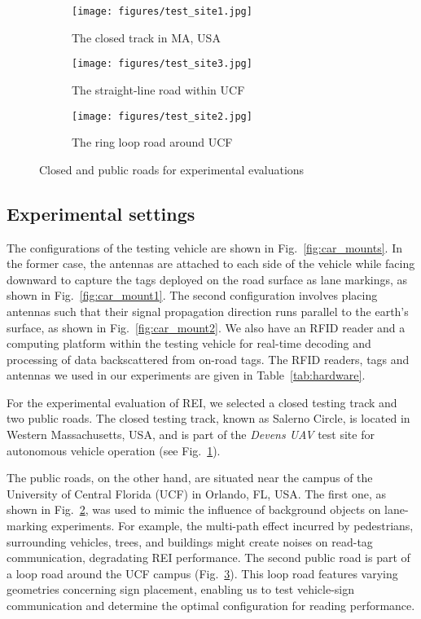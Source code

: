 \documentclass[lettersize,journal]{IEEEtran}
\begin{document}
\begin{figure*}[tb!]
\centering
\begin{subfigure}{0.3\textwidth}
  \centering
  
  \texttt{[image: figures/test\_site1.jpg]}
  \caption{The closed track in MA, USA}
  \label{fig:testing_road1}
\end{subfigure}
\begin{subfigure}{0.3\textwidth}
  \centering
  \texttt{[image: figures/test\_site3.jpg]}
  \caption{The straight-line road within UCF}
  \label{fig:testing_road2}
\end{subfigure}
\begin{subfigure}{0.3\textwidth}
  \centering
  \texttt{[image: figures/test\_site2.jpg]}
  \caption{The ring loop road around UCF}
  \label{fig:testing_road3}
\end{subfigure}
\caption{Closed and public roads for experimental evaluations}
\label{fig:testing_roads}
\end{figure*}

  
\subsection{Experimental settings}
The configurations of the testing vehicle are shown in Fig.~\ref{fig:car_mounts}. In the former case, the antennas are attached to each side of the vehicle while facing downward to capture the tags deployed on the road surface as lane markings, as shown in Fig.~\ref{fig:car_mount1}. The second configuration involves placing antennas such that their signal propagation direction runs parallel to the earth's surface, as shown in Fig.~\ref{fig:car_mount2}. We also have an RFID reader and a computing platform within the testing vehicle for real-time decoding and processing of data backscattered from on-road tags. The RFID readers, tags and antennas we used in our experiments are given in Table~\ref{tab:hardware}.

For the experimental evaluation of REI, we selected a closed testing track and two public roads. The closed testing track, known as Salerno Circle, is located in Western Massachusetts, USA, and is part of the \textit{Devens UAV} test site for autonomous vehicle operation (see Fig.~\ref{fig:testing_road1}). 

The public roads, on the other hand, are situated near the campus of the University of Central Florida (UCF) in Orlando, FL, USA. The first one, as shown in Fig.~\ref{fig:testing_road2}, was used to mimic the influence of background objects on lane-marking experiments. For example, the multi-path effect incurred by pedestrians, surrounding vehicles, trees, and buildings might create noises on read-tag communication, degradating REI performance. The second public road is part of a loop road around the UCF campus (Fig.~\ref{fig:testing_road3}). This loop road features varying geometries concerning sign placement, enabling us to test vehicle-sign communication and determine the optimal configuration for reading performance.
\end{document}
